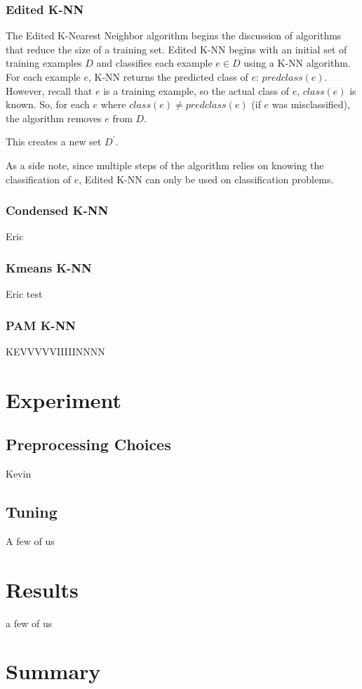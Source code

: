 \documentclass[twoside,11pt]{article}
\begin{document}
\subsubsection{Edited K-NN}
The Edited K-Nearest Neighbor algorithm begins the discussion of algorithms that reduce the size of a training set. Edited K-NN begins with an initial set of training examples $D$ and classifies each example $e \in D$ using a K-NN algorithm. For each example $e$, K-NN returns the predicted class of $e$: $predclass(e)$. However, recall that $e$ is a training example, so the actual class of $e$, $class(e)$ is known. So, for each $e$ where $class(e) \neq predclass(e)$ (if $e$ was misclassified), the algorithm removes $e$ from $D$.

This creates a new set $D^\prime$. 

As a side note, since multiple steps of the algorithm relies on knowing the classification of $e$, Edited K-NN can only be used on classification problems.



\subsubsection{Condensed K-NN}

Eric

\subsubsection{Kmeans K-NN}

Eric test

\subsubsection{PAM K-NN}

KEVVVVVIIIIINNNN

\section{Experiment}

\subsection{Preprocessing Choices}

Kevin

\subsection{Tuning}

A few of us

\section{Results}

a few of us

\section{Summary}




\end{document}
